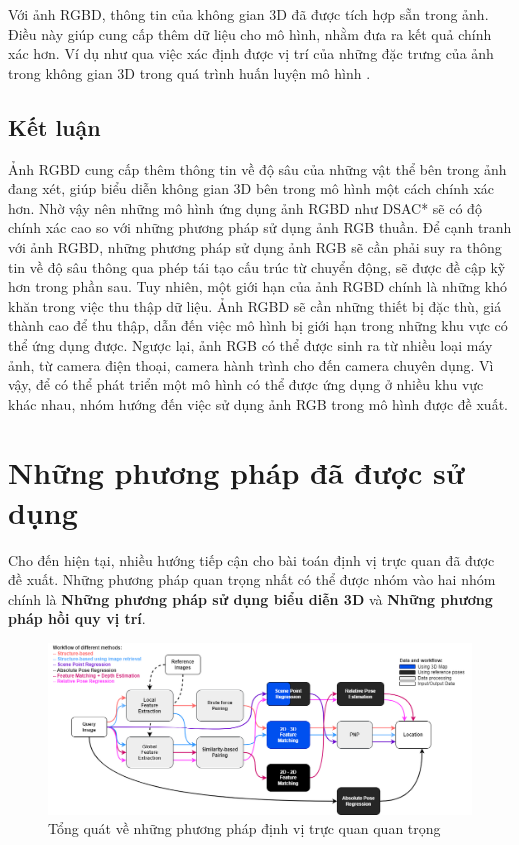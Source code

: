 Với ảnh RGBD, thông tin của không gian 3D đã được tích hợp sẵn trong ảnh. Điều này giúp cung cấp thêm dữ liệu cho mô hình, nhằm đưa ra kết quả chính xác hơn. Ví dụ như qua việc xác định được vị trí của những đặc trưng của ảnh trong không gian 3D trong quá trình huấn luyện mô hình \cite{brachmann2021visual,arnold2022mapfree}. 


\subsection{Kết luận}
Ảnh RGBD cung cấp thêm thông tin về độ sâu của những vật thể bên trong ảnh đang xét, giúp biểu diễn không gian 3D bên trong mô hình một cách chính xác hơn. Nhờ vậy nên những mô hình ứng dụng ảnh RGBD như DSAC* \cite{brachmann2021visual} sẽ có độ chính xác cao so với những phương pháp sử dụng ảnh RGB thuần. Để cạnh tranh với ảnh RGBD, những phương pháp sử dụng ảnh RGB sẽ cần phải suy ra thông tin về độ sâu thông qua phép tái tạo cấu trúc từ chuyển động, sẽ được đề cập kỹ hơn trong phần sau. Tuy nhiên, một giới hạn của ảnh RGBD chính là những khó khăn trong việc thu thập dữ liệu. Ảnh RGBD sẽ cần những thiết bị đặc thù, giá thành cao để thu thập, dẫn đến việc mô hình bị giới hạn trong những khu vực có thể ứng dụng được. Ngược lại, ảnh RGB có thể được sinh ra từ nhiều loại máy ảnh, từ camera điện thoại, camera hành trình cho đến camera chuyên dụng. Vì vậy, để có thể phát triển một mô hình có thể được ứng dụng ở nhiều khu vực khác nhau, nhóm hướng đến việc sử dụng ảnh RGB trong mô hình được đề xuất.
\section{Những phương pháp đã được sử dụng}

Cho đến hiện tại, nhiều hướng tiếp cận cho bài toán định vị trực quan đã được đề xuất. Những phương pháp quan trọng nhất có thể được nhóm vào hai nhóm chính là \textbf{Những phương pháp sử dụng biểu diễn 3D} và \textbf{Những phương pháp hồi quy vị trí}.

\begin{figure}[H]
    \centering
    \includegraphics[scale=0.45]{pics/Chapter2/overviewViLoc.png}
    \caption{Tổng quát về những phương pháp định vị trực quan quan trọng \cite{methodsLocal}}
\end{figure}

